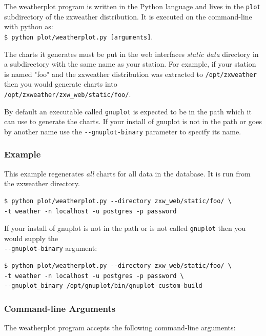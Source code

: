 \documentclass[a4paper,10pt,draft]{book}
\begin{document}
The weatherplot program is written in the Python language and lives in the \verb|plot| subdirectory of the zxweather distribution. It is executed on the command-line with python as: \\ \verb|$ python plot/weatherplot.py [arguments]|.

The charts it generates must be put in the web interfaces \emph{static data} directory in a subdirectory with the same name as your station. For example, if your station is named "foo" and the zxweather distribution was extracted to \verb|/opt/zxweather| then you would generate charts into \\ \verb|/opt/zxweather/zxw_web/static/foo/|.

By default an executable called \verb|gnuplot| is expected to be in the path which it can use to generate the charts. If your install of gnuplot is not in the path or goes by another name use the \verb|--gnuplot-binary| parameter to specify its name.

\subsubsection{Example}
This example regenerates \emph{all} charts for all data in the database. It is run from the zxweather directory.
\begin{verbatim}
$ python plot/weatherplot.py --directory zxw_web/static/foo/ \
-t weather -n localhost -u postgres -p password
\end{verbatim}

If your install of gnuplot is not in the path or is not called \verb|gnuplot| then you would supply the \\ \verb|--gnuplot-binary| argument:
\begin{verbatim}
$ python plot/weatherplot.py --directory zxw_web/static/foo/ \
-t weather -n localhost -u postgres -p password \
--gnuplot_binary /opt/gnuplot/bin/gnuplot-custom-build
\end{verbatim}

\subsubsection{Command-line Arguments}
The weatherplot program accepts the following command-line arguments:
\end{document}
